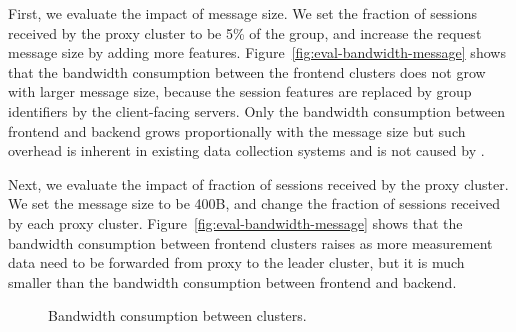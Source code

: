 First, we evaluate the impact of message size. 
We set the fraction of sessions received by the proxy cluster to be 5\% of the group, and increase the request message size by adding more features. 
Figure~\ref{fig:eval-bandwidth-message} shows that the bandwidth consumption between the frontend clusters does not grow with larger message size, because the session features are replaced by group identifiers by the client-facing servers.
Only the bandwidth consumption between frontend and backend grows proportionally with the message size
but such overhead is inherent in existing data collection systems and is not caused by \name.

Next, we evaluate the impact of fraction of sessions received by the proxy cluster. 
We set the message size to be 400B, and change the fraction of sessions received by each proxy cluster.
Figure~\ref{fig:eval-bandwidth-message} shows that the bandwidth consumption between frontend clusters raises as more measurement data need to be forwarded from proxy to the leader cluster, but it is much smaller than the bandwidth consumption between frontend and backend.



\begin{figure}[t!]
\captionsetup[subfigure]{justification=centering,farskip=-1pt,captionskip=5pt}
\centering
\caption{Bandwidth consumption between clusters.}
\label{fig:eval-bandwidth}
\end{figure}



